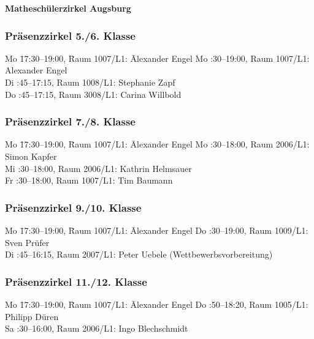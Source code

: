 \documentclass[a4paper,ngerman,14pt]{scrartcl}
\begin{document}
\onehalfspacing

\begin{raggedright}
\Large\textbf{Matheschülerzirkel Augsburg}
\end{raggedright}
\vspace{0.2em}

\subsubsection*{Präsenzzirkel 5./6. Klasse}
\begin{tabbing}
  Mo \= 17:30–19:00, \= Raum 1007/L1: \= Alexander Engel \kill
  Mo :30–19:00, \> Raum 1007/L1: \> Alexander Engel \\
  Di :45–17:15, \> Raum 1008/L1: \> Stephanie Zapf \\
  Do :45–17:15, \> Raum 3008/L1: \> Carina Willbold
\end{tabbing}

\subsubsection*{Präsenzzirkel 7./8. Klasse}

\begin{tabbing}
  Mo \= 17:30–19:00, \= Raum 1007/L1: \= Alexander Engel \kill
  Mo :30–18:00, \> Raum 2006/L1: \> Simon Kapfer \\
  Mi :30–18:00, \> Raum 2006/L1: \> Kathrin Helmsauer \\
  Fr :30–18:00, \> Raum 1007/L1: \> Tim Baumann
\end{tabbing}

\subsubsection*{Präsenzzirkel 9./10. Klasse}

\begin{tabbing}
  Mo \= 17:30–19:00, \= Raum 1007/L1: \= Alexander Engel \kill
  Do :30–19:00, \> Raum 1009/L1: \> Sven Prüfer \\
  Di :45–16:15, \> Raum 2007/L1: \> Peter Uebele (Wettbewerbsvorbereitung)
\end{tabbing}

\subsubsection*{Präsenzzirkel 11./12. Klasse}

\begin{tabbing}
  Mo \= 17:30–19:00, \= Raum 1007/L1: \= Alexander Engel \kill
  Do :50–18:20, \> Raum 1005/L1: \> Philipp Düren \\
  Sa :30–16:00, \> Raum 2006/L1: \> Ingo Blechschmidt
\end{tabbing}
\end{document}
